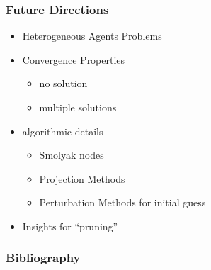 \documentclass[tikz]{beamer}
\begin{document}

\begin{frame}
  \frametitle{Future Directions}
  \begin{itemize}
  \item Heterogeneous Agents Problems
  \item Convergence Properties
    \begin{itemize}
    \item no solution
    \item multiple solutions
    \end{itemize}
\item algorithmic details
  \begin{itemize}
 \item Smolyak nodes
 \item Projection Methods
 \item Perturbation Methods for initial guess
  \end{itemize}
\item Insights for ``pruning''
  \end{itemize}
\end{frame}

\begin{frame}
  \frametitle{Bibliography}
  


\end{frame}
\end{document}
